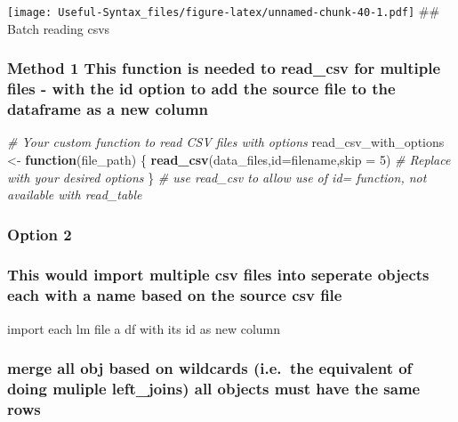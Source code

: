 \documentclass[
]{article}
\newenvironment{Shaded}{\begin{snugshade}}{\end{snugshade}}
\newcommand{\AttributeTok}[1]{\textcolor[rgb]{0.13,0.29,0.53}{#1}}
\newcommand{\CommentTok}[1]{\textcolor[rgb]{0.56,0.35,0.01}{\textit{#1}}}
\newcommand{\ControlFlowTok}[1]{\textcolor[rgb]{0.13,0.29,0.53}{\textbf{#1}}}
\newcommand{\DecValTok}[1]{\textcolor[rgb]{0.00,0.00,0.81}{#1}}
\newcommand{\FunctionTok}[1]{\textcolor[rgb]{0.13,0.29,0.53}{\textbf{#1}}}
\newcommand{\NormalTok}[1]{#1}
\newcommand{\OtherTok}[1]{\textcolor[rgb]{0.56,0.35,0.01}{#1}}
\newcommand{\StringTok}[1]{\textcolor[rgb]{0.31,0.60,0.02}{#1}}
\begin{document}
\texttt{[image: Useful-Syntax\_files/figure-latex/unnamed-chunk-40-1.pdf]}
\#\# Batch reading csvs

\hypertarget{method-1-this-function-is-needed-to-read_csv-for-multiple-files---with-the-id-option-to-add-the-source-file-to-the-dataframe-as-a-new-column}{%
\subsubsection{Method 1 This function is needed to read\_csv for multiple files - with the id option to add the source file to the dataframe as a new column}\label{method-1-this-function-is-needed-to-read_csv-for-multiple-files---with-the-id-option-to-add-the-source-file-to-the-dataframe-as-a-new-column}}

\begin{Shaded}
\begin{Highlighting}[]
\CommentTok{\# Your custom function to read CSV files with options}
\NormalTok{read\_csv\_with\_options }\OtherTok{\textless{}{-}} \ControlFlowTok{function}\NormalTok{(file\_path) \{}
  \FunctionTok{read\_csv}\NormalTok{(data\_files,}\AttributeTok{id=}\StringTok{\textquotesingle{}filename\textquotesingle{}}\NormalTok{,}\AttributeTok{skip =} \DecValTok{5}\NormalTok{)  }\CommentTok{\# Replace with your desired options}
\NormalTok{\}}
\CommentTok{\# use read\_csv to allow use of id= function, not available with read\_table}
\end{Highlighting}
\end{Shaded}

\hypertarget{option-2}{%
\subsubsection{Option 2}\label{option-2}}

\hypertarget{this-would-import-multiple-csv-files-into-seperate-objects-each-with-a-name-based-on-the-source-csv-file}{%
\subsubsection{This would import multiple csv files into seperate objects each with a name based on the source csv file}\label{this-would-import-multiple-csv-files-into-seperate-objects-each-with-a-name-based-on-the-source-csv-file}}

import each lm file a df with its id as new column

\hypertarget{merge-all-obj-based-on-wildcards-i.e.-the-equivalent-of-doing-muliple-left_joins-all-objects-must-have-the-same-rows}{%
\subsubsection{merge all obj based on wildcards (i.e.~the equivalent of doing muliple left\_joins) all objects must have the same rows}\label{merge-all-obj-based-on-wildcards-i.e.-the-equivalent-of-doing-muliple-left_joins-all-objects-must-have-the-same-rows}}
\end{document}
